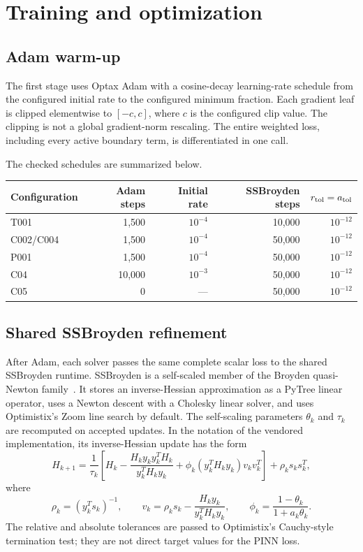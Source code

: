 \documentclass[11pt]{article}
\newcommand{\code}[1]{\texttt{\detokenize{#1}}}
\begin{document}
\section{Training and optimization}

\subsection{Adam warm-up}

The first stage uses Optax Adam with a cosine-decay learning-rate schedule
from the configured initial rate to the configured minimum fraction.  Each
gradient leaf is clipped elementwise to $[-c,c]$, where $c$ is the configured
clip value.  The clipping is not a global gradient-norm rescaling.  The entire
weighted loss, including every active boundary term, is differentiated in one
\code{jax.value_and_grad} call.

The checked schedules are summarized below.

\begin{center}
\begin{tabular}{lrrrr}
\toprule
Configuration & Adam steps & Initial rate & SSBroyden steps & $r_{\rm tol}=a_{\rm tol}$ \\
\midrule
T001 & 1,500 & $10^{-4}$ & 10,000 & $10^{-12}$ \\
C002/C004 & 1,500 & $10^{-4}$ & 50,000 & $10^{-12}$ \\
P001 & 1,500 & $10^{-4}$ & 50,000 & $10^{-12}$ \\
C04 & 10,000 & $10^{-3}$ & 50,000 & $10^{-12}$ \\
C05 & 0 & --- & 50,000 & $10^{-12}$ \\
\bottomrule
\end{tabular}
\end{center}

\subsection{Shared SSBroyden refinement}

After Adam, each solver passes the same complete scalar loss to the shared
SSBroyden runtime.  SSBroyden is a self-scaled member of the Broyden
quasi-Newton family~\cite{bioli2026}.  It stores an inverse-Hessian
approximation as a PyTree linear operator, uses a Newton descent with a
Cholesky linear solver, and uses Optimistix's Zoom line search by default.
The self-scaling parameters $\theta_k$ and $\tau_k$ are recomputed on accepted
updates.  In the notation of the vendored implementation, its inverse-Hessian
update has the form
\begin{equation}
 H_{k+1}=
 \frac{1}{\tau_k}\left[
 H_k-\frac{H_ky_ky_k^TH_k}{y_k^TH_ky_k}
 +\phi_k(y_k^TH_ky_k)v_kv_k^T
 \right]+\rho_ks_ks_k^T,
 \label{eq:ssbroyden}
\end{equation}
where
\begin{equation}
 \rho_k=(y_k^Ts_k)^{-1},\qquad
 v_k=\rho_ks_k-\frac{H_ky_k}{y_k^TH_ky_k},\qquad
 \phi_k=\frac{1-\theta_k}{1+a_k\theta_k}.
\end{equation}
The relative and absolute tolerances are passed to Optimistix's Cauchy-style
termination test; they are not direct target values for the PINN loss.
\end{document}
